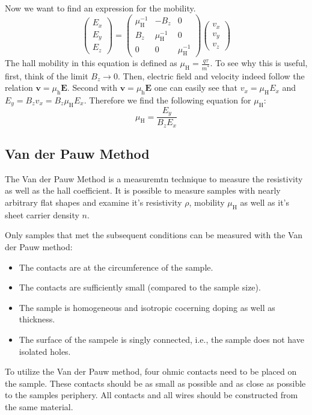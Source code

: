 Now we want to find an expression for the mobility.
\begin{equation}
	\begin{pmatrix}
		E_{x} \\
		E_{y} \\
		E_{z}
	\end{pmatrix}
	=\begin{pmatrix}
		\mu_\mathrm{H}^{-1} & -B_{z}              & 0                   \\
		B_{z}               & \mu_\mathrm{H}^{-1} & 0                   \\
		0                   & 0                   & \mu_\mathrm{H}^{-1}
	\end{pmatrix}
	\begin{pmatrix}
		v_{x} \\
		v_{y} \\
		v_{z}
	\end{pmatrix}
\end{equation}
The hall mobility in this equation is defined as $\mu_{\mathrm{H}}=\frac{q\tau}{m^{*}}$.
To see why this is useful, first, think of the limit $B_{z}\to 0$.
Then, electric field and velocity indeed follow the relation $\mathbf{v}=\mu_{\mathrm{h}}\mathbf{E}$.
Second with $\mathbf{v}=\mu_{\mathrm{h}}\mathbf{E}$ one can easily see that
$v_{x} = \mu_{\mathrm{H}}E_{x}$ and $E_{y}=B_{z}v_{x}=B_{z}\mu_{\mathrm{H}}E_{x}$.
Therefore we find the following equation for $\mu_\mathrm{H}$:
\begin{equation}
	\mu_{\mathrm{H}}=\frac{E_{y}}{B_{z}E_{x}}
\end{equation}

\subsection{Van der Pauw Method}
The Van der Pauw Method is a measuremtn technique to measure the resistivity as well as the hall coefficient.
It is possible to measure samples with nearly arbitrary flat shapes and examine it's resistivity $\rho$, 
mobility $\mu_\mathrm{H}$ as well as it's sheet carrier density $n$. 

Only samples that met the subsequent conditions can be measured with the Van der Pauw method:
\begin{itemize}
	\item The contacts are at the circumference of the sample.
	\item The contacts are sufficiently small (compared to the sample size).
	\item The sample is homogeneous and isotropic cocerning doping as well as thickness.
	\item The surface of the sampele is singly connected, i.e., the sample does not have isolated holes.
\end{itemize}
To utilize the Van der Pauw method, four ohmic contacts need to be placed on the sample.
These contacts should be as small as possible and as close as possible to the samples periphery. 
All contacts and all wires should be constructed from the same material. 

